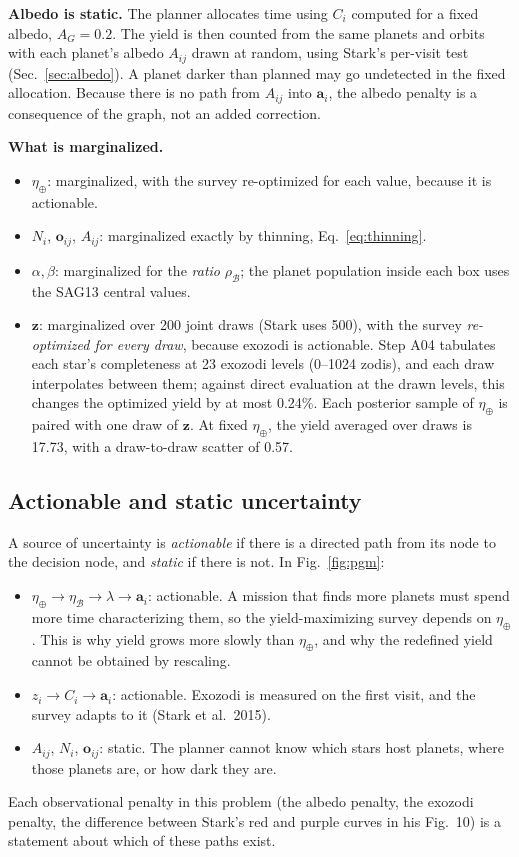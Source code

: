 \documentclass[11pt,a4paper]{article}
\begin{document}
\textbf{Albedo is static.} The planner allocates time using $C_i$ computed for a fixed albedo,
$A_G = 0.2$. The yield is then counted from the same planets and orbits with each planet's albedo
$A_{ij}$ drawn at random, using Stark's per-visit test (Sec.~\ref{sec:albedo}). A planet darker
than planned may go undetected in the fixed allocation. Because there is no path from $A_{ij}$
into $\mathbf{a}_i$, the albedo penalty is a consequence of the graph, not an added correction.

\textbf{What is marginalized.}
\begin{itemize}
\item $\eta_\oplus$: marginalized, with the survey re-optimized for each value, because it is
actionable.
\item $N_i$, $\mathbf{o}_{ij}$, $A_{ij}$: marginalized exactly by thinning,
Eq.~\eqref{eq:thinning}.
\item $\alpha, \beta$: marginalized for the \emph{ratio} $\rho_\mathcal{B}$; the planet population
inside each box uses the SAG13 central values.
\item $\mathbf{z}$: marginalized over 200 joint draws (Stark uses 500), with the survey
\emph{re-optimized for every draw}, because exozodi is actionable. Step A04 tabulates each star's
completeness at 23 exozodi levels (0--1024 zodis), and each draw interpolates between them; against
direct evaluation at the drawn levels, this changes the optimized yield by at most
0.24\%. Each posterior sample of $\eta_\oplus$ is paired with one draw of $\mathbf{z}$.
At fixed $\eta_\oplus$, the yield averaged over draws is 17.73, with a draw-to-draw scatter
of 0.57.
\end{itemize}

\subsection{Actionable and static uncertainty}

A source of uncertainty is \emph{actionable} if there is a directed path from its node to the
decision node, and \emph{static} if there is not. In Fig.~\ref{fig:pgm}:
\begin{itemize}
\item $\eta_\oplus \to \eta_\mathcal{B} \to \lambda \to \mathbf{a}_i$: actionable. A mission that
finds more planets must spend more time characterizing them, so the yield-maximizing survey depends
on $\eta_\oplus$. This is why yield grows more slowly than $\eta_\oplus$, and why the redefined
yield cannot be obtained by rescaling.
\item $z_i \to C_i \to \mathbf{a}_i$: actionable. Exozodi is measured on the first visit, and the
survey adapts to it (Stark et al.\ 2015).
\item $A_{ij}$, $N_i$, $\mathbf{o}_{ij}$: static. The planner cannot know which stars host
planets, where those planets are, or how dark they are.
\end{itemize}
Each observational penalty in this problem (the albedo penalty, the exozodi penalty, the difference
between Stark's red and purple curves in his Fig.~10) is a statement about which of these paths
exist.
\end{document}
